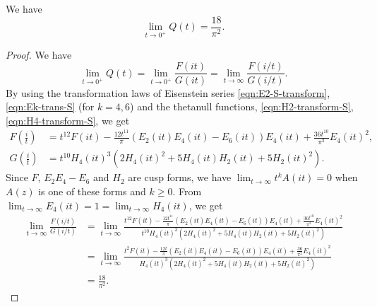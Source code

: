 \begin{lemma}\label{lemma:Qlim}\leanok
We have
\begin{equation}
    \lim_{t \to 0^+} Q(t) = \frac{18}{\pi^2}.
\end{equation}
\end{lemma}
\begin{proof}\leanok
We have
\begin{equation}
    \lim_{t \to 0^+} Q(t) = \lim_{t \to 0^+} \frac{F(it)}{G(it)} = \lim_{t \to \infty} \frac{F(i/t)}{G(i/t)}.
\end{equation}
By using the transformation laws of Eisenstein series \eqref{eqn:E2-S-transform}, \eqref{eqn:Ek-trans-S} (for $k = 4, 6$) and the thetanull functions, \eqref{eqn:H2-transform-S}, \eqref{eqn:H4-transform-S}, we get
\begin{align}
    F\left(\frac{i}{t}\right) &= t^{12} F(it) - \frac{12t^{11}}{\pi} (E_2(it)E_4(it) - E_6(it))E_4(it) + \frac{36t^{10}}{\pi^2}E_4(it)^2, \\
    G\left(\frac{i}{t}\right) &= t^{10} H_{4}(it)^{3}(2H_{4}(it)^{2} + 5 H_{4}(it)H_{2}(it) + 5 H_{2}(it)^{2}).
\end{align}
Since $F$, $E_2 E_4 - E_6$ and $H_2$ are cusp forms, we have $\lim_{t \to \infty}t^k A(it) = 0$ when $A(z)$ is one of these forms and $k \geq 0$.
From $\lim_{t \to \infty} E_4(it) = 1 = \lim_{t \to \infty}H_{4}(it)$, we get
\begin{align}
    \lim_{t \to \infty} \frac{F(i/t)}{G(i/t)}
    &= \lim_{t \to \infty} \frac{t^{12} F(it) - \frac{12t^{11}}{\pi} (E_2(it)E_4(it) - E_6(it))E_4(it) + \frac{36t^{10}}{\pi^2}E_4(it)^2}{t^{10} H_{4}(it)^{3}(2H_{4}(it)^{2} + 5 H_{4}(it)H_{2}(it) + 5 H_{2}(it)^{2})} \\
    &= \lim_{t \to \infty} \frac{t^{2} F(it) - \frac{12t}{\pi} (E_2(it)E_4(it) - E_6(it))E_4(it) + \frac{36}{\pi^2}E_4(it)^2}{H_{4}(it)^{3}(2H_{4}(it)^{2} + 5 H_{4}(it)H_{2}(it) + 5 H_{2}(it)^{2})} \\
    &= \frac{18}{\pi^2}.
\end{align}
\end{proof}

